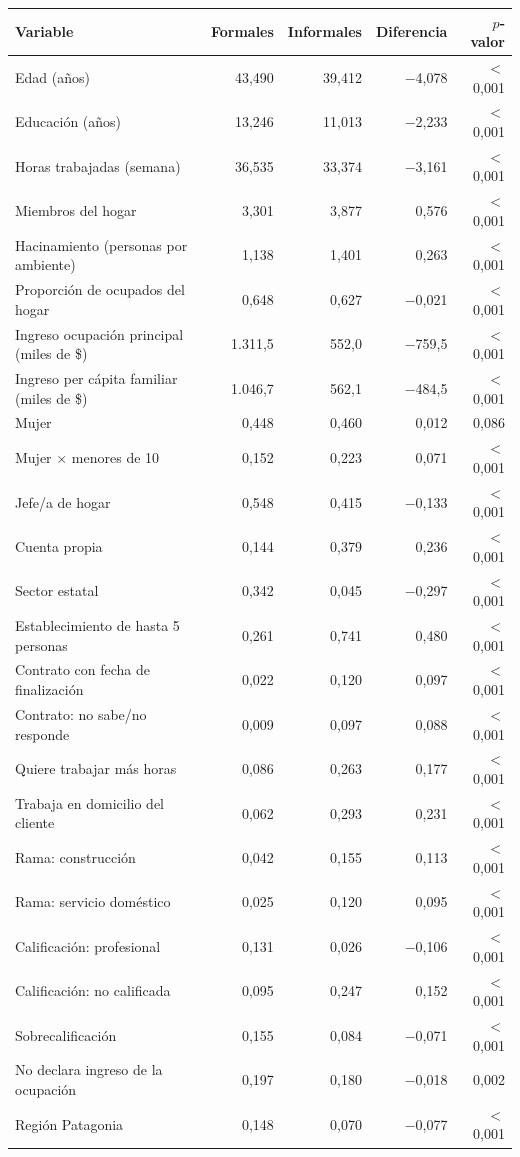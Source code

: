 \begin{tabular}{lrrrr}
\toprule
Variable & Formales & Informales & Diferencia & $p$-valor \\
\midrule
Edad (años) & 43,490 & 39,412 & $-$4,078 & $<$0,001 \\
Educación (años) & 13,246 & 11,013 & $-$2,233 & $<$0,001 \\
Horas trabajadas (semana) & 36,535 & 33,374 & $-$3,161 & $<$0,001 \\
Miembros del hogar & 3,301 & 3,877 & 0,576 & $<$0,001 \\
Hacinamiento (personas por ambiente) & 1,138 & 1,401 & 0,263 & $<$0,001 \\
Proporción de ocupados del hogar & 0,648 & 0,627 & $-$0,021 & $<$0,001 \\
Ingreso ocupación principal (miles de \$) & 1.311,5 & 552,0 & $-$759,5 & $<$0,001 \\
Ingreso per cápita familiar (miles de \$) & 1.046,7 & 562,1 & $-$484,5 & $<$0,001 \\
Mujer & 0,448 & 0,460 & 0,012 & 0,086 \\
Mujer $\times$ menores de 10 & 0,152 & 0,223 & 0,071 & $<$0,001 \\
Jefe/a de hogar & 0,548 & 0,415 & $-$0,133 & $<$0,001 \\
Cuenta propia & 0,144 & 0,379 & 0,236 & $<$0,001 \\
Sector estatal & 0,342 & 0,045 & $-$0,297 & $<$0,001 \\
Establecimiento de hasta 5 personas & 0,261 & 0,741 & 0,480 & $<$0,001 \\
Contrato con fecha de finalización & 0,022 & 0,120 & 0,097 & $<$0,001 \\
Contrato: no sabe/no responde & 0,009 & 0,097 & 0,088 & $<$0,001 \\
Quiere trabajar más horas & 0,086 & 0,263 & 0,177 & $<$0,001 \\
Trabaja en domicilio del cliente & 0,062 & 0,293 & 0,231 & $<$0,001 \\
Rama: construcción & 0,042 & 0,155 & 0,113 & $<$0,001 \\
Rama: servicio doméstico & 0,025 & 0,120 & 0,095 & $<$0,001 \\
Calificación: profesional & 0,131 & 0,026 & $-$0,106 & $<$0,001 \\
Calificación: no calificada & 0,095 & 0,247 & 0,152 & $<$0,001 \\
Sobrecalificación & 0,155 & 0,084 & $-$0,071 & $<$0,001 \\
No declara ingreso de la ocupación & 0,197 & 0,180 & $-$0,018 & 0,002 \\
Región Patagonia & 0,148 & 0,070 & $-$0,077 & $<$0,001 \\
\bottomrule
\end{tabular}